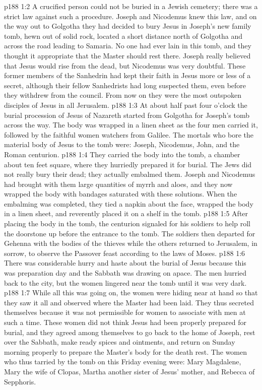\vs p188 1:2 A crucified person could not be buried in a Jewish cemetery; there was a strict law against such a procedure. Joseph and Nicodemus knew this law, and on the way out to Golgotha they had decided to bury Jesus in Joseph’s new family tomb, hewn out of solid rock, located a short distance north of Golgotha and across the road leading to Samaria. No one had ever lain in this tomb, and they thought it appropriate that the Master should rest there. Joseph really believed that Jesus would rise from the dead, but Nicodemus was very doubtful. These former members of the Sanhedrin had kept their faith in Jesus more or less of a secret, although their fellow Sanhedrists had long suspected them, even before they withdrew from the council. From now on they were the most outspoken disciples of Jesus in all Jerusalem.
\vs p188 1:3 At about half past four o’clock the burial procession of Jesus of Nazareth started from Golgotha for Joseph’s tomb across the way. The body was wrapped in a linen sheet as the four men carried it, followed by the faithful women watchers from Galilee. The mortals who bore the material body of Jesus to the tomb were: Joseph, Nicodemus, John, and the Roman centurion.
\vs p188 1:4 They carried the body into the tomb, a chamber about ten feet square, where they hurriedly prepared it for burial. The Jews did not really bury their dead; they actually embalmed them. Joseph and Nicodemus had brought with them large quantities of myrrh and aloes, and they now wrapped the body with bandages saturated with these solutions. When the embalming was completed, they tied a napkin about the face, wrapped the body in a linen sheet, and reverently placed it on a shelf in the tomb.
\vs p188 1:5 After placing the body in the tomb, the centurion signaled for his soldiers to help roll the doorstone up before the entrance to the tomb. The soldiers then departed for Gehenna with the bodies of the thieves while the others returned to Jerusalem, in sorrow, to observe the Passover feast according to the laws of Moses.
\vs p188 1:6 There was considerable hurry and haste about the burial of Jesus because this was preparation day and the Sabbath was drawing on apace. The men hurried back to the city, but the women lingered near the tomb until it was very dark.
\vs p188 1:7 While all this was going on, the women were hiding near at hand so that they saw it all and observed where the Master had been laid. They thus secreted themselves because it was not permissible for women to associate with men at such a time. These women did not think Jesus had been properly prepared for burial, and they agreed among themselves to go back to the home of Joseph, rest over the Sabbath, make ready spices and ointments, and return on Sunday morning properly to prepare the Master’s body for the death rest. The women who thus tarried by the tomb on this Friday evening were: Mary Magdalene, Mary the wife of Clopas, Martha another sister of Jesus’ mother, and Rebecca of Sepphoris.
